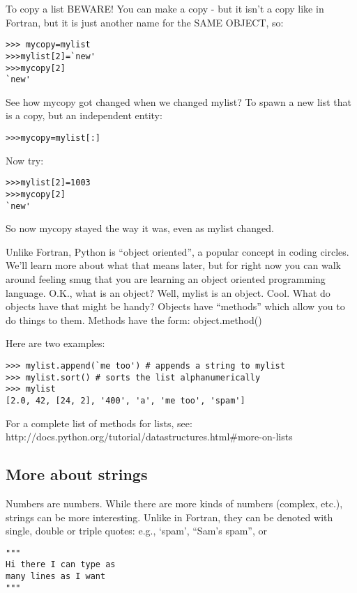 To copy a list BEWARE! You can make  a copy - but it isn't a copy like in Fortran, but it is just another name for the SAME OBJECT, so:
{\singlespacing \color{blue} \begin{verbatim}
>>> mycopy=mylist
>>>mylist[2]=`new'
>>>mycopy[2]
`new'
\end{verbatim}}
\noindent
See how mycopy got changed when we changed mylist?
\noindent
To spawn a new list that is a copy, but an independent entity:
{\singlespacing \color{blue} \begin{verbatim}
>>>mycopy=mylist[:]
\end{verbatim}}
\noindent
Now try:
{\singlespacing \color{blue} \begin{verbatim}
>>>mylist[2]=1003
>>>mycopy[2]
`new'
\end{verbatim}}
\noindent
So now {\color{blue}mycopy}  stayed the way it was, even as {\color{blue}mylist } changed.  


Unlike Fortran, Python is ``object oriented'', a popular concept in coding circles.  We'll learn more about what that means later, but for right now you can walk around feeling smug that you are learning an object oriented programming language.   O.K., what is an object?  Well, 
{\color{blue}mylist} is an object.   Cool.  What do objects have that might be handy?  
Objects have ``methods'' which allow you to do things to them.  Methods have the form:
{\color{blue}object.method()}

\noindent
Here are two examples:

{\singlespacing \color{blue} \begin{verbatim}
>>> mylist.append(`me too') # appends a string to mylist
>>> mylist.sort() # sorts the list alphanumerically
>>> mylist
[2.0, 42, [24, 2], '400', 'a', 'me too', 'spam']
\end{verbatim}}


\noindent

 For a complete list of methods for lists, see:
http://docs.python.org/tutorial/datastructures.html\#more-on-lists

\subsection{More about strings}
Numbers are numbers. While there are more kinds of numbers (complex, etc.),
strings can be  more interesting. Unlike in Fortran, they can be denoted with single, double or triple quotes:  e.g.,
`spam',  ``Sam's spam'', or
{\singlespacing \color{blue} \begin{verbatim}
"""  
Hi there I can type as
many lines as I want
"""
\end{verbatim}}

